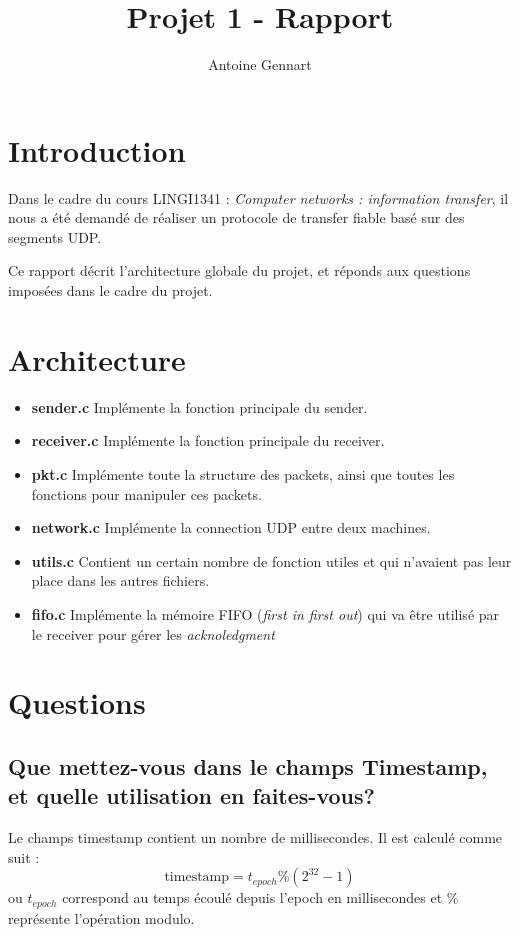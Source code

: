 \documentclass[10pt,a4paper]{article}
\author{Antoine Gennart}
\title{Projet 1 - Rapport}
\begin{document}
\maketitle


\section{Introduction}
Dans le cadre du cours LINGI1341 : \textit{Computer networks : information transfer}, il nous a été demandé de réaliser un protocole de transfer fiable basé sur des segments UDP.

Ce rapport décrit l'architecture globale du projet, et réponds aux questions imposées dans le cadre du projet.

\section{Architecture}

\begin{itemize}
	\item \textbf{sender.c} Implémente la fonction principale du sender.
	\item \textbf{receiver.c} Implémente la fonction principale du receiver.
	\item \textbf{pkt.c} Implémente toute la structure des packets, ainsi que toutes les fonctions pour manipuler ces packets.
	\item \textbf{network.c} Implémente la connection UDP entre deux machines.
	\item \textbf{utils.c} Contient un certain nombre de fonction utiles et qui n'avaient pas leur place dans les autres fichiers.
	\item \textbf{fifo.c} Implémente la mémoire FIFO (\textit{first in first out}) qui va être utilisé par le receiver pour gérer les \textit{acknoledgment}
\end{itemize}

\section{Questions}
\subsection{Que mettez-vous dans le champs Timestamp, et quelle utilisation en faites-vous?}
Le champs timestamp contient un nombre de millisecondes. Il est calculé comme suit : 
\begin{equation*}
	\text{timestamp} = t_{epoch} \% (2^{32}-1)
\end{equation*}
ou $t_{epoch}$ correspond au temps écoulé depuis l'epoch en millisecondes et \% représente l'opération modulo.
\end{document}
